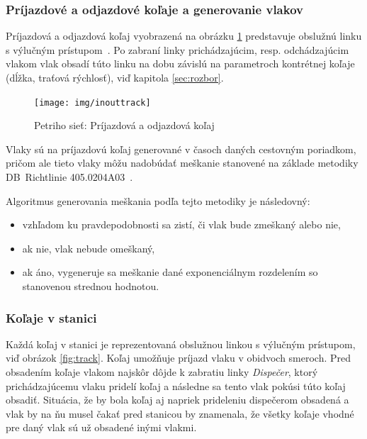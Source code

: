 \documentclass[12pt,a4paper,titlepage,final]{article}
\begin{document}

\subsubsection*{Príjazdové a odjazdové koľaje a generovanie vlakov} \label{sec:generovanie}

Príjazdová a odjazdová koľaj vyobrazená na obrázku \ref{fig:inouttrack} predstavuje obslužnú
linku s výlučným prístupom~\cite[str.\,36]{opora}. Po zabraní linky prichádzajúcim, resp. odchádzajúcim vlakom vlak obsadí túto linku na dobu závislú na parametroch kontrétnej koľaje (dĺžka, traťová rýchlosť), viď kapitola \ref{sec:rozbor}.

\begin{figure}[!h]
	\centering
	\texttt{[image: img/inouttrack]}
	\caption{Petriho sieť: Príjazdová a odjazdová koľaj} \label{fig:inouttrack}
\end{figure}

Vlaky sú na príjazdovú koľaj generované v časoch daných cestovným poriadkom, pričom ale tieto vlaky môžu nadobúdať meškanie stanovené na základe metodiky DB~Richtlinie 405.0204A03~\cite[str.\,11]{studie_mas}.

\vspace{1em}
{\setlength{\parindent}{0cm}
Algoritmus generovania meškania podľa tejto metodiky je následovný:
\begin{itemize}
	\item vzhľadom ku pravdepodobnosti sa zistí, či vlak bude zmeškaný alebo nie,
	\item ak nie, vlak nebude omeškaný,
	\item ak áno, vygeneruje sa meškanie dané exponenciálnym rozdelením so stanovenou
	strednou hodnotou.
\end{itemize}
}

\subsubsection*{Koľaje v stanici}

Každá koľaj v stanici je reprezentovaná obslužnou linkou s výlučným prístupom, viď obrázok \ref{fig:track}.
Koľaj umožňuje príjazd vlaku v obidvoch smeroch. Pred obsadením koľaje vlakom najskôr dôjde k zabratiu linky \textit{Dispečer}, ktorý prichádzajúcemu vlaku pridelí koľaj a následne sa tento vlak pokúsi túto koľaj obsadiť. Situácia, že by bola koľaj aj napriek prideleniu dispečerom obsadená a vlak by na ňu musel čakať pred stanicou by znamenala, že všetky koľaje vhodné pre daný vlak sú už obsadené inými vlakmi.
\end{document}
